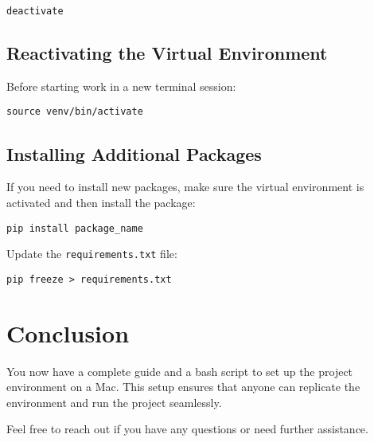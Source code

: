 \documentclass{article}
\begin{document}
\begin{verbatim}
deactivate
\end{verbatim}

\subsection{Reactivating the Virtual Environment}

Before starting work in a new terminal session:

\begin{verbatim}
source venv/bin/activate
\end{verbatim}

\subsection{Installing Additional Packages}

If you need to install new packages, make sure the virtual environment is activated and then install the package:

\begin{verbatim}
pip install package_name
\end{verbatim}

Update the \verb|requirements.txt| file:

\begin{verbatim}
pip freeze > requirements.txt
\end{verbatim}

\section{Conclusion}

You now have a complete guide and a bash script to set up the project environment on a Mac. This setup ensures that anyone can replicate the environment and run the project seamlessly.

Feel free to reach out if you have any questions or need further assistance.
\end{document}
